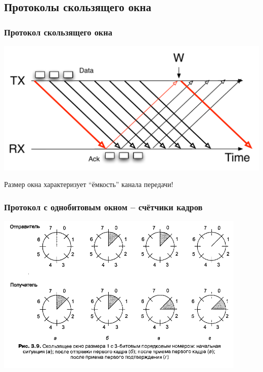 \documentclass[utf8]{beamer}
\begin{document}
\subsection{Протоколы скользящего окна}
\begin{frame}
\frametitle{Протокол скользящего окна}
\begin{center}
\includegraphics[width=\textwidth]{pic/window-size-example.pdf}
\end{center}
Размер окна характеризует ``ёмкость'' канала передачи!
\end{frame}
\begin{frame}
\frametitle{Протокол с однобитовым окном -- счётчики кадров}
\begin{center}
\includegraphics[width=0.9\textwidth]{pic/sliding-window.png}
\end{center}
\end{frame}
\end{document}
